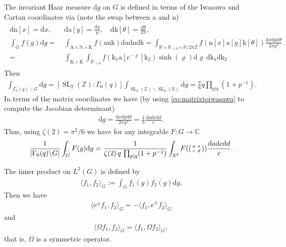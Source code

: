 \documentclass[12pt]{amsart}
\theoremstyle{definition}
\theoremstyle{remark}
\numberwithin{equation}{section}
\newcommand{\C}{{\mathbb C}}
\newcommand{\R}{{\mathbb R}}
\newcommand{\Z}{{\mathbb Z}}
\newcommand{\1}{{\mathbf 1}}
\newcommand{\SL}{\operatorname{SL}_2}
\renewcommand{\a}{\mathrm{a}}
\newcommand{\n}{\mathrm{n}}
\renewcommand{\k}{\mathrm{k}}
\renewcommand{\d}{\mathrm d}
\renewcommand{\n}{\mathrm{n}}
\begin{document}
The invariant Haar measure $\d g$ on $G$ is defined in terms of the Iwasawa and Cartan coordinates via (note the swap between $\a$ and $\n$)
\begin{align} \label{eq:integrationonG}
\begin{split}
     \d \mathrm{n}[x] = \d x, \quad & \d \mathrm{a}[y] = \frac{\d y}{y}, \quad \d \mathrm{k}[\theta] = \frac{\d \theta}{2\pi}, \\
   \int_G  f(g)\d g =& \int_{\mathrm{A} \times \mathrm{N} \times \mathrm{K}} f(\a \n \k)  \d \a\d \n \d \k  =    \int_{\R\times \R_{>0} \times \R/2\pi\Z} f(\n[x] \a[y] \k[\theta]) \frac{\d x \d y \d \theta}{2\pi y^2} \\
   =&\int_{\mathrm{K} \times \mathrm{K}} \int_{\R_{>0}} f(\k_1 \a[e^{-\varrho}] \k_2)  \sinh(\varrho) \d \varrho \,\d \k_1 \d \k_2
\end{split}
\end{align}
Then
\begin{align}
    \int_{\Gamma_0(q)\backslash G} \d g= [\SL(\Z): \Gamma_0(q)] \int_{\SL(\Z)\backslash \SL(\R)} \d g= \frac{\pi}{6} q \prod_{p|q}(1+p^{-1}). \, 
\end{align}
In terms of the matrix coordinates we have (by using \eqref{eq:matrixtoiwasawa} to compute the Jacobian determinant)
\begin{align*}
    \d g = \frac{\d x \d y \d \theta}{2\pi y^2} = \frac{1}{\pi} \frac{\d a \d c \d d}{c}.
\end{align*}
Thus, using $\zeta(2) = \pi^2/6$ we have for any integrable $F:G \to\C$
\begin{align} \label{eq:integralinmatrix}
   \frac{1}{ |\Gamma_0(q)\backslash G|}    \int_G  F(g)\d g = \frac{1}{  \zeta(2) \, q \, \prod_{p|q}(1+p^{-1})}   \int_{\R^3}  F(\smqty(a & \ast \\ c & d)) \frac{\d a \d c \d d}{c}.
\end{align}

The inner product on $L^2(G)$ is defined by
\begin{align*}
    \langle f_1,f_2\rangle_G := \int_G f_1(g) \overline{f_2(g)} \d g.
\end{align*}
Then we have
\begin{align} \label{eq:integrationbypartsraisinglowering}
   \langle 
 \mathrm{e}^{\pm} f_1,f_2\rangle_G  = -   \langle 
 f_1, \mathrm{e}^{\mp}f_2\rangle_G
\end{align}
 and
 \begin{align} \label{eq:omegaselfadjoint}
      \langle 
\Omega f_1,f_2\rangle_G   =   \langle 
 f_1, \Omega f_2\rangle_G, 
 \end{align}
that is, $\Omega$ is  a symmetric operator.
 
\end{document}
